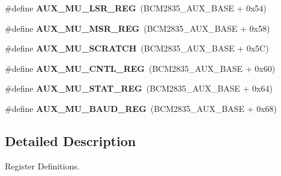\begin{DoxyCompactItemize}
\#define {\bfseries A\+U\+X\+\_\+\+M\+U\+\_\+\+L\+S\+R\+\_\+\+R\+EG}~(B\+C\+M2835\+\_\+\+A\+U\+X\+\_\+\+B\+A\+SE + 0x54)
\item 
\mbox{\label{group__raspberrypi__reg_ga1fcf5077c1462be3b0b88e6fb566dc5a}} 
\#define {\bfseries A\+U\+X\+\_\+\+M\+U\+\_\+\+M\+S\+R\+\_\+\+R\+EG}~(B\+C\+M2835\+\_\+\+A\+U\+X\+\_\+\+B\+A\+SE + 0x58)
\item 
\mbox{\label{group__raspberrypi__reg_gaac4a818fcfce0789797099f3d7cc005a}} 
\#define {\bfseries A\+U\+X\+\_\+\+M\+U\+\_\+\+S\+C\+R\+A\+T\+CH}~(B\+C\+M2835\+\_\+\+A\+U\+X\+\_\+\+B\+A\+SE + 0x5\+C)
\item 
\mbox{\label{group__raspberrypi__reg_gae245c90b298a3cbf784f859aefc4dd84}} 
\#define {\bfseries A\+U\+X\+\_\+\+M\+U\+\_\+\+C\+N\+T\+L\+\_\+\+R\+EG}~(B\+C\+M2835\+\_\+\+A\+U\+X\+\_\+\+B\+A\+SE + 0x60)
\item 
\mbox{\label{group__raspberrypi__reg_ga3e0dfe3b86a80ee776d1eb99670efd8f}} 
\#define {\bfseries A\+U\+X\+\_\+\+M\+U\+\_\+\+S\+T\+A\+T\+\_\+\+R\+EG}~(B\+C\+M2835\+\_\+\+A\+U\+X\+\_\+\+B\+A\+SE + 0x64)
\item 
\mbox{\label{group__raspberrypi__reg_gaf4c86eb600e81f138962457dd19ecd98}} 
\#define {\bfseries A\+U\+X\+\_\+\+M\+U\+\_\+\+B\+A\+U\+D\+\_\+\+R\+EG}~(B\+C\+M2835\+\_\+\+A\+U\+X\+\_\+\+B\+A\+SE + 0x68)
\end{DoxyCompactItemize}


\subsection{Detailed Description}
Register Definitions. 

